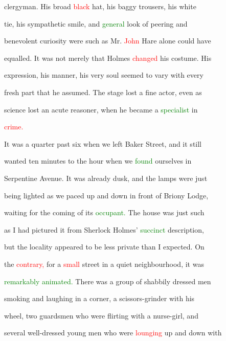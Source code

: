  clergyman. His broad \textcolor{red}{black} hat, his baggy trousers, his \textcolor{BurntOrange}{white}

 tie, his \textcolor{BurntOrange}{sympathetic} \textcolor{BurntOrange}{smile,} and \textcolor{green}{general} look of peering and

 benevolent \textcolor{BurntOrange}{curiosity} were such as Mr. \textcolor{red}{John} Hare alone could have

 equalled. It was not merely that Holmes \textcolor{red}{changed} his costume. His

 expression, his manner, his very soul seemed to vary with every

 fresh part that he assumed. The stage \textcolor{BurntOrange}{lost} a fine actor, even as

 science \textcolor{BurntOrange}{lost} an acute reasoner, when he became a \textcolor{green}{specialist} in

 \textcolor{red}{crime.}



 It was a quarter past six when we left Baker Street, and it still

 wanted ten minutes to the hour when we \textcolor{green}{found} ourselves in

 Serpentine Avenue. It was already dusk, and the lamps were just

 being lighted as we paced up and down in front of Briony Lodge,

 \textcolor{BurntOrange}{waiting} for the coming of its \textcolor{green}{occupant.} The house was just such

 as I had pictured it from Sherlock Holmes' \textcolor{green}{succinct} description,

 but the locality appeared to be less private than I \textcolor{BurntOrange}{expected.} On

 the \textcolor{red}{contrary,} for a \textcolor{red}{small} street in a \textcolor{BurntOrange}{quiet} neighbourhood, it was

 \textcolor{green}{remarkably} \textcolor{green}{animated.} There was a group of shabbily dressed men

 smoking and \textcolor{BurntOrange}{laughing} in a corner, a scissors-grinder with his

 wheel, two guardsmen who were \textcolor{BurntOrange}{flirting} with a nurse-girl, and

 several well-dressed \textcolor{BurntOrange}{young} men who were \textcolor{red}{lounging} up and down with

